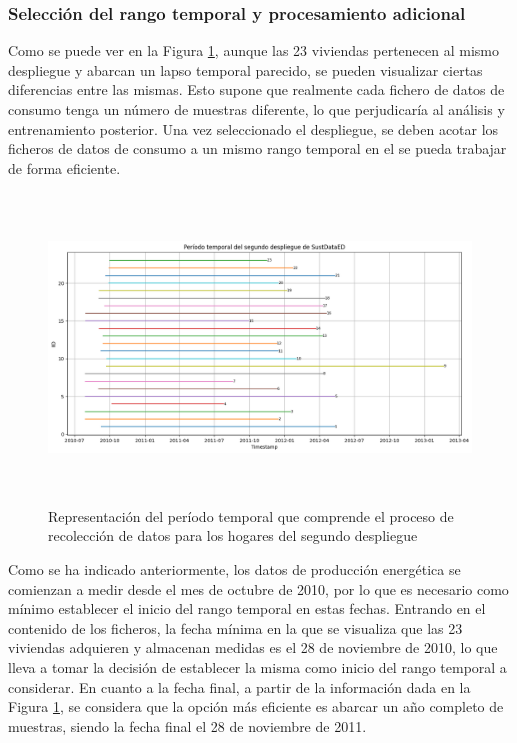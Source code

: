 \subsubsection{Selección del rango temporal y procesamiento adicional}
\label{sec:rango}
Como se puede ver en la Figura \ref{fig:despliegue2}, aunque las 23 viviendas pertenecen al mismo despliegue y abarcan un lapso temporal parecido, se pueden visualizar ciertas diferencias entre las mismas. Esto supone que realmente cada fichero de datos de consumo tenga un número de muestras diferente, lo que perjudicaría al análisis y entrenamiento posterior. Una vez seleccionado el despliegue, se deben acotar los ficheros de datos de consumo a un mismo rango temporal en el se pueda trabajar de forma eficiente. 

\vspace{3mm}

\begin{figure}[H]
    \centering
    \includegraphics[width=1\textwidth,height=8.2cm]{img/diseno/despliegue2.png}
    \caption{Representación del período temporal que comprende el proceso de recolección de datos para los hogares del segundo despliegue}
    \label{fig:despliegue2}
\end{figure}

\vspace{3mm}

Como se ha indicado anteriormente, los datos de producción energética se comienzan a medir desde el mes de octubre de 2010, por lo que es necesario como mínimo establecer el inicio del rango temporal en estas fechas. Entrando en el contenido de los ficheros, la fecha mínima en la que se visualiza que las 23 viviendas adquieren y almacenan medidas es el 28 de noviembre de 2010, lo que lleva a tomar la decisión de establecer la misma como inicio del rango temporal a considerar. En cuanto a la fecha final, a partir de la información dada en la Figura \ref{fig:despliegue2}, se considera que la opción más eficiente es abarcar un año completo de muestras, siendo la fecha final el 28 de noviembre de 2011. 

